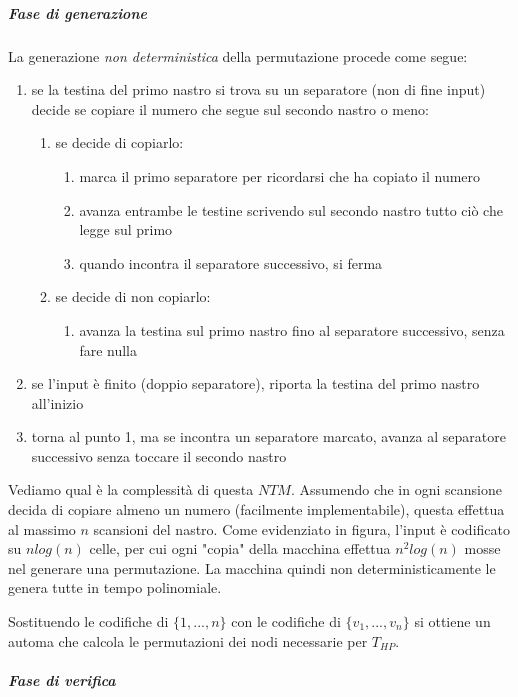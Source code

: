 \subparagraph{Fase di generazione}

La generazione \textit{non deterministica} della permutazione procede come segue:
\begin{enumerate}[label*=\arabic*.]
	\item se la testina del primo nastro si trova su un separatore (non di fine input) decide se copiare il numero che segue sul secondo nastro o meno:
	\begin{enumerate}[label*=\arabic*.]
		\item se decide di copiarlo:
		\begin{enumerate}[label*=\arabic*.]
			\item marca il primo separatore per ricordarsi che ha copiato il numero 
			\item avanza entrambe le testine scrivendo sul secondo nastro tutto ciò che legge sul primo
			\item quando incontra il separatore successivo, si ferma
		\end{enumerate}
		\item se decide di non copiarlo:
		\begin{enumerate}[label*=\arabic*.]
			\item avanza la testina sul primo nastro fino al separatore successivo, senza fare nulla
		\end{enumerate}
	\end{enumerate}
	\item se l'input è finito (doppio separatore), riporta la testina del primo nastro all'inizio
	\item torna al punto 1, ma se incontra un separatore marcato, avanza al separatore successivo senza toccare il secondo nastro
\end{enumerate}

Vediamo qual è la complessità di questa $NTM$. Assumendo che in ogni scansione decida di copiare almeno un numero (facilmente implementabile), questa effettua al massimo $n$ scansioni del nastro. Come evidenziato in figura, l'input è codificato su $nlog(n)$ celle, per cui ogni "copia" della macchina effettua $n^2 log(n)$ mosse nel generare una permutazione. La macchina quindi non deterministicamente le genera tutte in tempo polinomiale.

Sostituendo le codifiche di $\{1, ..., n\}$ con le codifiche di $\{ v_1, ..., v_n\}$ si ottiene un automa che calcola le permutazioni dei nodi necessarie per $T_{HP}$.

\subparagraph{Fase di verifica}

